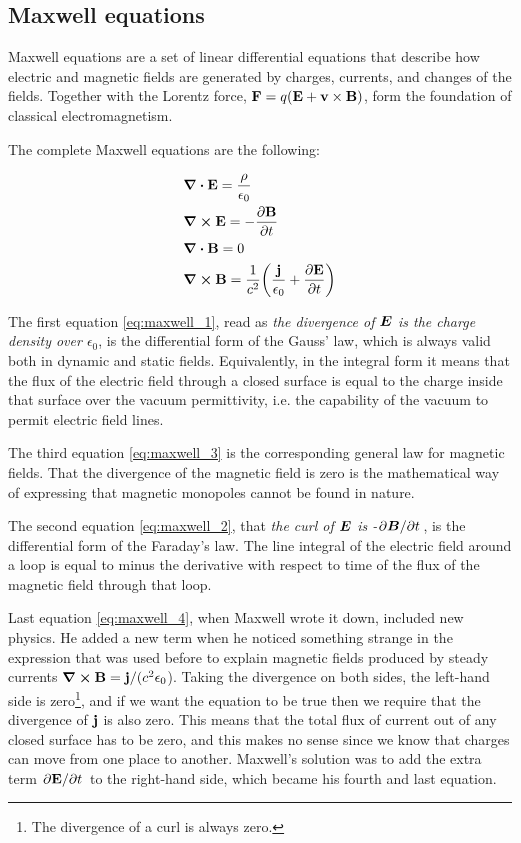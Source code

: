 \documentclass[11pt,a4paper]{article}
\begin{document}
\subsection{Maxwell equations}

Maxwell equations \cite{feynman} are a set of linear differential equations that describe how electric and magnetic fields are generated by charges, currents, and changes of the fields. Together with the Lorentz force, $\vb{F}=q(\vb{E}+\vb{v}\times\vb{B})$, form the foundation of classical electromagnetism.

The complete Maxwell equations are the following:

\begin{subequations}\label{eq:maxwell_equations}
\begin{align}
&\div\vb{E}=\frac{\rho}{\epsilon_0}\label{eq:maxwell_1}\\
&\curl\vb{E}=-\pdv{\vb{B}}{t}\label{eq:maxwell_2}\\
&\div\vb{B}=0\label{eq:maxwell_3}\\
&\curl\vb{B}=\frac{1}{c^2}\qty(\frac{\vb{j}}{\epsilon_0}+\pdv{\vb{E}}{t})\label{eq:maxwell_4}
\end{align}
\end{subequations}

The first equation \eqref{eq:maxwell_1}, read as \emph{the divergence of $\vb*{E}$ is the charge density over $\epsilon_0$}, is the differential form of the Gauss' law, which is always valid both in dynamic and static fields. Equivalently, in the integral form it means that the flux of the electric field through a closed surface is equal to the charge inside that surface over the vacuum permittivity, i.e. the capability of the vacuum to permit electric field lines.

The third equation \eqref{eq:maxwell_3} is the corresponding general law for magnetic fields. That the divergence of the magnetic field is zero is the mathematical way of expressing that magnetic monopoles cannot be found in nature.

The second equation \eqref{eq:maxwell_2}, that \emph{the curl of $\vb*{E}$ is -$\pdv*{\vb*{B}}{t}$}, is the differential form of the Faraday's law. The line integral of the electric field around a loop is equal to minus the derivative with respect to time of the flux of the magnetic field through that loop.

Last equation \eqref{eq:maxwell_4}, when Maxwell wrote it down, included new physics. He added a new term when he noticed something strange in the expression that was used before to explain magnetic fields produced by steady currents $\curl\vb{B}=\vb{j}/(c^2\epsilon_0$). Taking the divergence on both sides, the left-hand side is zero\footnote{The divergence of a curl is always zero.}, and if we want the equation to be true then we require that the divergence of $\vb{j}$ is also zero. This means that the total flux of current out of any closed surface has to be zero, and this makes no sense since we know that charges can move from one place to another. Maxwell's solution was to add the extra term $\pdv*{\vb{E}}{t}$ to the right-hand side, which became his fourth and last equation.
\end{document}
